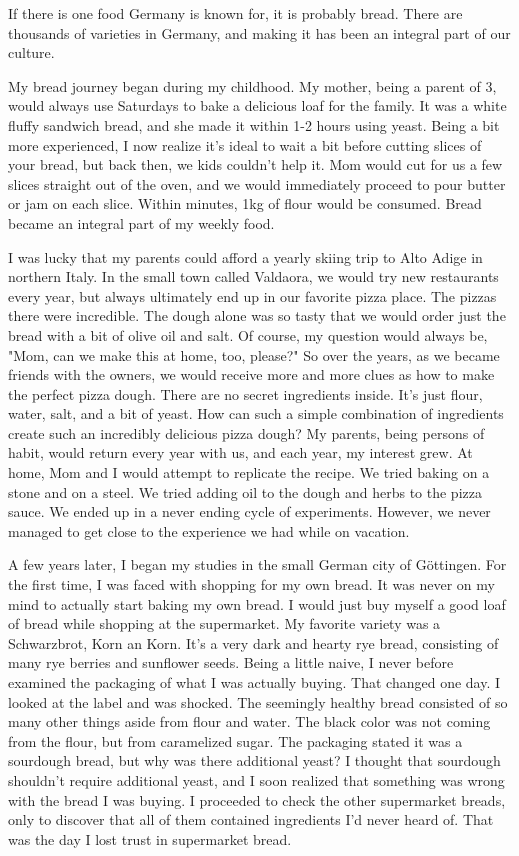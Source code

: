 If there is one food Germany is known for, it is probably bread.
There are thousands of varieties in Germany,
and making it has been an integral part of our culture.

My bread journey began during my childhood. My mother, being a parent
of 3, would always use Saturdays to bake a delicious loaf for the family.
It was a white fluffy sandwich bread, and she made it within 1-2 hours using yeast.
Being a bit more experienced, I now realize it's
ideal to wait a bit before cutting slices of your bread, but back then,
we kids couldn't help it. Mom would cut for us a few slices straight out of the oven, and we would
immediately proceed to pour butter or jam on each slice. Within minutes, 1kg of
flour would be consumed. Bread became an integral part of my weekly food.

I was lucky that my parents could afford a yearly skiing trip to
Alto Adige in northern Italy. In the small town called Valdaora, we
would try new restaurants every year, but always ultimately end up in our favorite
pizza place. The pizzas there were incredible. The dough
alone was so tasty that we would order just the bread with a
bit of olive oil and salt.
Of course, my question would always be, "Mom, can we make this at home, too, please?"
So over the years, as we became friends with the owners, we would receive
more and more clues as how to make the perfect pizza dough. There
are no secret ingredients inside. It's just flour, water, salt, and a bit of yeast.
How can such a simple combination of ingredients create such an incredibly delicious
pizza dough? My parents, being persons of habit, would return every year with us,
and each year, my interest grew. At home, Mom and I would attempt to replicate
the recipe. We tried baking on a stone and on a steel. We tried adding oil to the dough and herbs
to the pizza sauce. We ended up in a never ending cycle of experiments. However, we never managed
to get close to the experience we had while on vacation.

A few years later, I began my studies in the small German city of Göttingen.
For the first time, I was faced with shopping for my own bread. It was never
on my mind to actually start baking my own bread. I would just buy myself
a good loaf of bread while shopping at the supermarket. My favorite variety
was a Schwarzbrot, Korn an Korn. It's a very dark and hearty rye bread,
consisting of many rye berries and sunflower seeds. Being a little naive,
I never before examined the packaging of what I was actually buying. That
changed one day. I looked at the label and was shocked. The seemingly
healthy bread consisted of so many other things aside from flour and water.
The black color was not coming from the flour, but from caramelized sugar.
The packaging stated it was a sourdough bread, but why was there additional yeast?
I thought that sourdough shouldn't require additional yeast, and I soon realized that
something was wrong with the bread I was buying.
I proceeded to check the other supermarket breads, only to discover that all of them
contained ingredients I'd never heard of. That was the day I lost trust
in supermarket bread.

